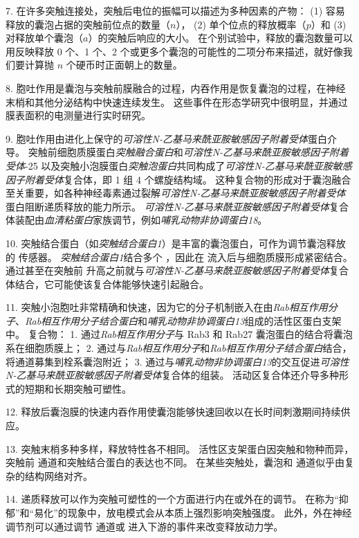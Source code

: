 7. 在许多突触连接处，突触后电位的振幅可以描述为多种因素的产物：
(1) 容易释放的囊泡占据的突触前位点的数量（$n$），
(2) 单个位点的释放概率（$p$）和
(3) 对释放单个囊泡（$a$）的突触后响应的大小。
在个别试验中，释放的囊泡数量可以用反映释放 0 个、1 个、2 个或更多个囊泡的可能性的二项分布来描述，就好像我们要计算抛 $n$ 个硬币时正面朝上的数量。


8. 胞吐作用是囊泡与突触前膜融合的过程，内吞作用是恢复囊泡的过程，在神经末梢和其他分泌结构中快速连续发生。
这些事件在形态学研究中很明显，并通过膜表面积的电测量进行实时研究。 


9. 胞吐作用由进化上保守的\textit{可溶性N-乙基马来酰亚胺敏感因子附着受体}蛋白介导。
突触前细胞质膜蛋白\textit{突触融合蛋白}和\textit{可溶性N-乙基马来酰亚胺敏感因子附着受体}-25 以及突触小泡膜蛋白\textit{突触泡蛋白}共同构成了\textit{可溶性N-乙基马来酰亚胺敏感因子附着受体}复合体，即 1 组 4 个螺旋结构域。
这种复合物的形成对于囊泡融合至关重要，如各种神经毒素通过裂解\textit{可溶性N-乙基马来酰亚胺敏感因子附着受体}蛋白阻断递质释放的能力所示。
\textit{可溶性N-乙基马来酰亚胺敏感因子附着受体}复合体装配由\textit{血清粘蛋白}家族调节，例如\textit{哺乳动物非协调蛋白18}。 


10. 突触结合蛋白（如\textit{突触结合蛋白1}）是丰富的囊泡蛋白，可作为调节囊泡释放的  传感器。
\textit{突触结合蛋白1}结合多个 ，因此在  流入后与细胞质膜形成紧密结合。
通过甚至在突触前  升高之前就与\textit{可溶性N-乙基马来酰亚胺敏感因子附着受体}复合体结合，它可能使该复合体能够快速引起融合。


11. 突触小泡胞吐非常精确和快速，因为它的分子机制嵌入在由\textit{Rab相互作用分子}、\textit{Rab相互作用分子结合蛋白}和\textit{哺乳动物非协调蛋白13}组成的活性区蛋白支架中。
复合物：
1. 通过\textit{Rab相互作用分子}与 Rab3 和 Rab27 囊泡蛋白的结合将囊泡系在细胞质膜上；
2. 通过与\textit{Rab相互作用分子}和\textit{Rab相互作用分子结合蛋白}结合，将通道募集到栓系囊泡附近；
3. 通过与\textit{哺乳动物非协调蛋白13}的交互促进\textit{可溶性N-乙基马来酰亚胺敏感因子附着受体}复合体的组装。
活动区复合体还介导多种形式的短期和长期突触可塑性。 


12. 释放后囊泡膜的快速内吞作用使囊泡能够快速回收以在长时间刺激期间持续供应。


13. 突触末梢多种多样，释放特性各不相同。
活性区支架蛋白因突触和物种而异，突触前  通道和突触结合蛋白的表达也不同。
在某些突触处，囊泡和  通道似乎由复杂的结构网络对齐。


14. 递质释放可以作为突触可塑性的一个方面进行内在或外在的调节。
在称为“抑郁”和“易化”的现象中，放电模式会从本质上强烈影响突触强度。
此外，外在神经调节剂可以通过调节  通道或  进入下游的事件来改变释放动力学。




